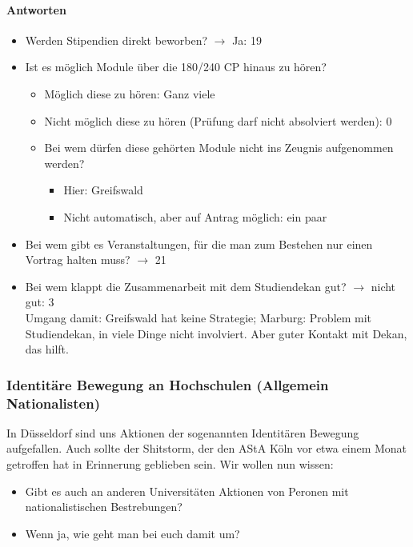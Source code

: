       \paragraph{Antworten}
        \begin{itemize}
          \item Werden Stipendien direkt beworben? $\rightarrow$ Ja: 19
          \item Ist es möglich Module über die 180/240 CP hinaus zu hören?
            \begin{itemize}
              \item Möglich diese zu hören: Ganz viele
              \item Nicht möglich diese zu hören (Prüfung darf nicht absolviert werden): 0
              \item Bei wem dürfen diese gehörten Module nicht ins Zeugnis aufgenommen werden?
                \begin{itemize}
                  \item Hier: Greifswald
                  \item Nicht automatisch, aber auf Antrag möglich: ein paar
                \end{itemize}
            \end{itemize}
          \item Bei wem gibt es Veranstaltungen, für die man zum Bestehen nur einen Vortrag halten muss? $\rightarrow$ 21
          \item Bei wem klappt die Zusammenarbeit mit dem Studiendekan gut? $\rightarrow$ nicht gut: 3 \\
            Umgang damit: Greifswald hat keine Strategie;
              Marburg: Problem mit Studiendekan, in viele Dinge nicht involviert. Aber guter Kontakt mit Dekan, das hilft.
        \end{itemize}

    \subsubsection*{Identitäre Bewegung an Hochschulen (Allgemein Nationalisten)}

In Düsseldorf sind uns Aktionen der sogenannten Identitären Bewegung aufgefallen. Auch sollte der Shitstorm, der den AStA Köln vor etwa einem Monat getroffen hat in Erinnerung geblieben sein. Wir wollen nun wissen:
      \begin{itemize}
        \item Gibt es auch an anderen Universitäten Aktionen von Peronen mit nationalistischen Bestrebungen?
        \item Wenn ja, wie geht man bei euch damit um?
      \end{itemize}

